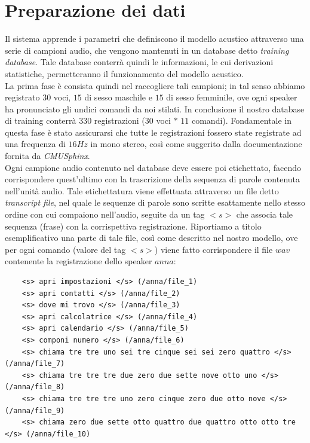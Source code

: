 \documentclass[12pt]{article}
\begin{document}
\section{Preparazione dei dati}
    Il sistema apprende i parametri che definiscono il modello acustico attraverso una serie di campioni audio, che vengono mantenuti in un database detto \textit{training database}. Tale database conterrà quindi le informazioni, le cui derivazioni statistiche, permetteranno il funzionamento del modello acustico.\\
    La prima fase è consista quindi nel raccogliere tali campioni; in tal senso abbiamo registrato $30$ voci, $15$ di sesso maschile e $15$ di sesso femminile, ove ogni speaker ha pronunciato gli undici comandi da noi stilati. In conclusione il nostro database di training conterrà $330$ registrazioni ($30$ voci $*$ $11$ comandi). Fondamentale in questa fase è stato assicurarsi che tutte le registrazioni fossero state registrate ad una frequenza di $16 Hz$ in mono stereo, così come suggerito dalla documentazione fornita da \textit{CMUSphinx}.\\       
    Ogni campione audio contenuto nel database deve essere poi etichettato, facendo  corrispondere quest'ultimo con la trascrizione della sequenza di parole contenuta nell'unità audio.  
    Tale etichettatura viene effettuata attraverso un file detto \textit{transcript file}, nel quale le sequenze di parole sono scritte esattamente nello stesso ordine con cui compaiono nell'audio, seguite da un tag $<s>$ che associa tale sequenza (frase) con la corrispettiva registrazione.
    Riportiamo a titolo esemplificativo una parte di tale file, così come descritto nel nostro modello, ove per ogni comando (valore del tag $<s>$) viene fatto corrispondere il file $wav$ contenente la registrazione dello speaker $anna$: 
    \newpage
    \begin{lstlisting}
    <s> apri impostazioni </s> (/anna/file_1)
    <s> apri contatti </s> (/anna/file_2)
    <s> dove mi trovo </s> (/anna/file_3)
    <s> apri calcolatrice </s> (/anna/file_4)
    <s> apri calendario </s> (/anna/file_5)
    <s> componi numero </s> (/anna/file_6)
    <s> chiama tre tre uno sei tre cinque sei sei zero quattro </s> (/anna/file_7)
    <s> chiama tre tre tre due zero due sette nove otto uno </s> (/anna/file_8)
    <s> chiama tre tre tre uno zero cinque zero due otto nove </s> (/anna/file_9)
    <s> chiama zero due sette otto quattro due quattro otto otto tre </s> (/anna/file_10)    
    \end{lstlisting}
    
\end{document}
